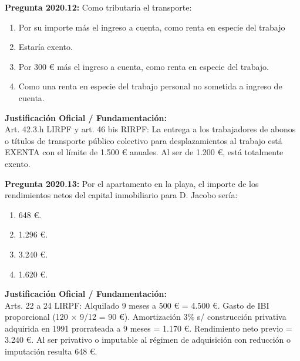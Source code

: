 \documentclass[11pt,a4paper,openany]{article}
\begin{document}
\noindent\textbf{\sffamily Pregunta 2020.12:} Como tributaría el transporte:\\[0.15cm]
\begin{enumerate}[label=\textbf{\alph*)},leftmargin=1.8em,itemsep=1.5pt,topsep=2pt,partopsep=0pt,parsep=0pt]
    \item Por su importe más el ingreso a cuenta, como renta en especie del trabajo
    \item Estaría exento.
    \item Por 300 \euro{} más el ingreso a cuenta, como renta en especie del trabajo.
    \item Como una renta en especie del trabajo personal no sometida a ingreso de cuenta.
\end{enumerate}
\begin{solucionBox}
\textbf{Justificación Oficial / Fundamentación:}\\[0.1cm]
Art. 42.3.h LIRPF y art. 46 bis RIRPF: La entrega a los trabajadores de abonos o títulos de transporte público colectivo para desplazamientos al trabajo está EXENTA con el límite de 1.500 \euro{} anuales. Al ser de 1.200 \euro{}, está totalmente exento.
\end{solucionBox}
\vspace{0.35cm}

\noindent\textbf{\sffamily Pregunta 2020.13:} Por el apartamento en la playa, el importe de los rendimientos netos del capital inmobiliario para D. Jacobo sería:\\[0.15cm]
\begin{enumerate}[label=\textbf{\alph*)},leftmargin=1.8em,itemsep=1.5pt,topsep=2pt,partopsep=0pt,parsep=0pt]
    \item 648 \euro{}.
    \item 1.296 \euro{}.
    \item 3.240 \euro{}.
    \item 1.620 \euro{}.
\end{enumerate}
\begin{solucionBox}
\textbf{Justificación Oficial / Fundamentación:}\\[0.1cm]
Arts. 22 a 24 LIRPF: Alquilado 9 meses a 500 \euro{} = 4.500 \euro{}. Gasto de IBI proporcional (120 $\times$  9/12 = 90 \euro{}). Amortización 3\% s/ construcción privativa adquirida en 1991 prorrateada a 9 meses = 1.170 \euro{}. Rendimiento neto previo = 3.240 \euro{}. Al ser privativo o imputable al régimen de adquisición con reducción o imputación resulta 648 \euro{}.
\end{solucionBox}
\vspace{0.35cm}
\end{document}
